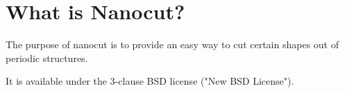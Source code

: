 \section{What is Nanocut?}

The purpose of nanocut is to provide an easy way to cut certain shapes out of periodic structures.

It is available under the 3-clause BSD license ("New BSD License").